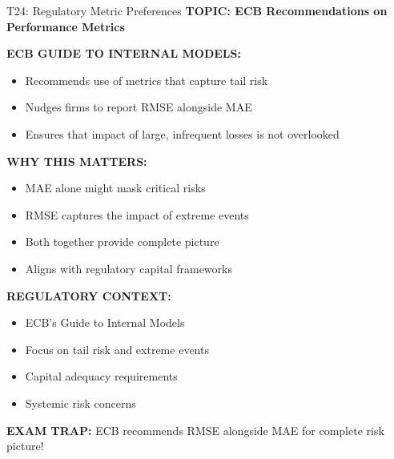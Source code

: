\documentclass[8pt]{beamer}
\begin{document}
	\begin{frame}{T24: Regulatory Metric Preferences}
		\fontsize{6.5}{7.5}\selectfont
		\textbf{TOPIC: ECB Recommendations on Performance Metrics}
		
		\vspace{0.1cm}
		\textbf{ECB GUIDE TO INTERNAL MODELS:}
		\begin{itemize}
			\item Recommends use of metrics that capture tail risk
			\item Nudges firms to report RMSE alongside MAE
			\item Ensures that impact of large, infrequent losses is not overlooked
		\end{itemize}
		
		\vspace{0.1cm}
		\textbf{WHY THIS MATTERS:}
		\begin{itemize}
			\item MAE alone might mask critical risks
			\item RMSE captures the impact of extreme events
			\item Both together provide complete picture
			\item Aligns with regulatory capital frameworks
		\end{itemize}
		
		\vspace{0.1cm}
		\textbf{REGULATORY CONTEXT:}
		\begin{itemize}
			\item ECB's Guide to Internal Models
			\item Focus on tail risk and extreme events
			\item Capital adequacy requirements
			\item Systemic risk concerns
		\end{itemize}
		
		\textcolor{myred}{\textbf{EXAM TRAP:}} ECB recommends \textcolor{myblue}{RMSE alongside MAE} for complete risk picture!
	\end{frame}
	
\end{document}
